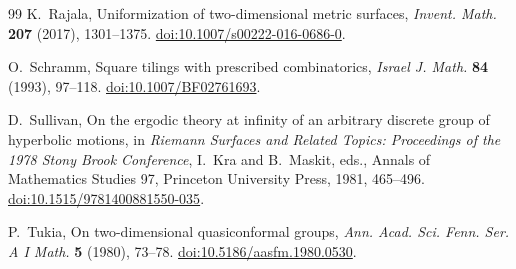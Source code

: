 \begin{thebibliography}{99}
K.~Rajala, Uniformization of two-dimensional metric surfaces,
\emph{Invent. Math.} \textbf{207} (2017), 1301--1375.
\href{https://doi.org/10.1007/s00222-016-0686-0}{doi:10.1007/s00222-016-0686-0}.

O.~Schramm, Square tilings with prescribed combinatorics,
\emph{Israel J. Math.} \textbf{84} (1993), 97--118.
\href{https://doi.org/10.1007/BF02761693}{doi:10.1007/BF02761693}.

D.~Sullivan, On the ergodic theory at infinity of an arbitrary discrete
group of hyperbolic motions, in \emph{Riemann Surfaces and Related Topics:
Proceedings of the 1978 Stony Brook Conference}, I.~Kra and B.~Maskit, eds.,
Annals of Mathematics Studies 97, Princeton University Press, 1981, 465--496.
\href{https://doi.org/10.1515/9781400881550-035}{doi:10.1515/9781400881550-035}.

P.~Tukia, On two-dimensional quasiconformal groups,
\emph{Ann. Acad. Sci. Fenn. Ser. A I Math.} \textbf{5} (1980), 73--78.
\href{https://doi.org/10.5186/aasfm.1980.0530}{doi:10.5186/aasfm.1980.0530}.

\end{thebibliography}

